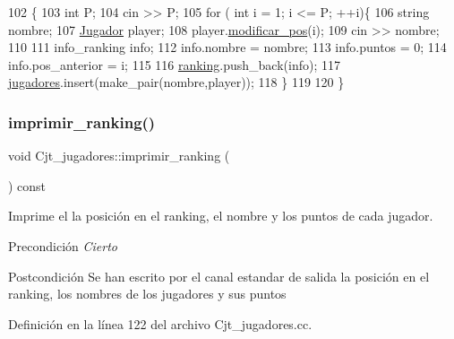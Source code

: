 \begin{DoxyCode}
102 \{
103     \textcolor{keywordtype}{int} P;
104     cin >> P;
105     \textcolor{keywordflow}{for} ( \textcolor{keywordtype}{int} i = 1; i <= P; ++i)\{
106         \textcolor{keywordtype}{string} nombre;
107         \hyperlink{class_jugador}{Jugador} player;
108         player.\hyperlink{class_jugador_af77bc217af6013d9e57cab34dd03921c}{modificar\_pos}(i);
109         cin >> nombre;
110         
111         info\_ranking info;
112         info.nombre = nombre;
113         info.puntos = 0;
114         info.pos\_anterior = i;
115 
116         \hyperlink{class_cjt__jugadores_a2a64dd6a0c9315af038dfdb4c27da059}{ranking}.push\_back(info);
117         \hyperlink{class_cjt__jugadores_ae3fc5f98e0f343b039bd7dff0e616ecc}{jugadores}.insert(make\_pair(nombre,player)); 
118       \}
119 
120 \}
\end{DoxyCode}
\mbox{\label{class_cjt__jugadores_a2eca08ea3674049547e6eb6242da1df5}} 
\subsubsection{\texorpdfstring{imprimir\+\_\+ranking()}{imprimir\_ranking()}}
{\footnotesize\ttfamily void Cjt\+\_\+jugadores\+::imprimir\+\_\+ranking (\begin{DoxyParamCaption}{ }\end{DoxyParamCaption}) const}



Imprime el la posición en el ranking, el nombre y los puntos de cada jugador. 

\begin{DoxyPrecond}{Precondición}
{\itshape Cierto} 
\end{DoxyPrecond}
\begin{DoxyPostcond}{Postcondición}
Se han escrito por el canal estandar de salida la posición en el ranking, los nombres de los jugadores y sus puntos 
\end{DoxyPostcond}


Definición en la línea 122 del archivo Cjt\+\_\+jugadores.\+cc.


